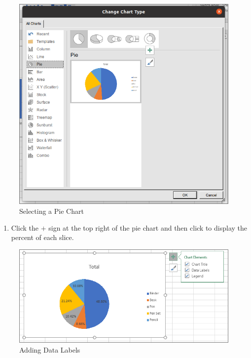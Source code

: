 \begin{figure}[H]
	\centering
	\includegraphics[width=\maxwidth{.95\linewidth}]{gfx/ch07_fig30}
	\caption{Selecting a Pie Chart}
	\label{07:fig30}
\end{figure}

\begin{enumerate}[resume]	
	\item Click the $ + $ sign at the top right of the pie chart and then click  to display the percent of each slice.
\end{enumerate}

\begin{figure}[H]
	\centering
	\includegraphics[width=\maxwidth{.95\linewidth}]{gfx/ch07_fig31}
	\caption{Adding Data Labels}
	\label{07:fig31}
\end{figure}

